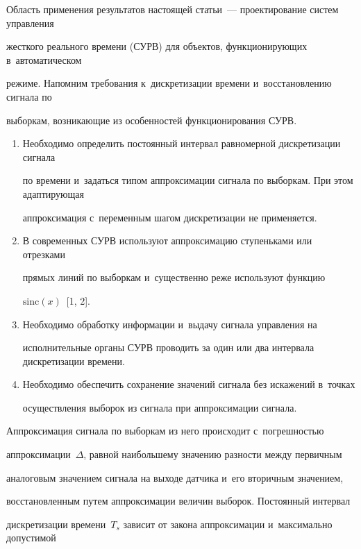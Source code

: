   Область применения результатов настоящей статьи~--- проектирование систем управления 


жесткого реального времени (СУРВ) для объектов, функ\-цио\-ни\-ру\-ющих в~автоматическом 


режиме. Напомним требования к~дискретизации времени и~восстановлению сигнала по 


выборкам, возникающие из особенностей функционирования СУРВ.


  \begin{enumerate}[1.]


  \item Необходимо определить постоянный интервал равномерной дискретизации сигнала 


по времени и~задаться типом аппроксимации сигнала по выборкам. При этом адаптирующая 


аппроксимация с~переменным шагом дискретизации не применяется.


  \item В современных СУРВ используют аппроксимацию ступеньками или отрезками 


прямых линий по выборкам и~существенно реже используют функцию 


$\mathrm{sinc}(x)$~[1, 2].


  \item Необходимо обработку информации и~выдачу сигнала управления на 


исполнительные органы СУРВ проводить за один или два интервала дискретизации времени.


  \item Необходимо обеспечить сохранение значений сигнала без искажений в~точках 


осуществления выборок из сигнала при аппроксимации сигнала. 


  \end{enumerate}


  


  Аппроксимация сигнала по выборкам из него происходит с~погрешностью 


аппроксимации~$\Delta$, равной наибольшему значению разности между первичным 


аналоговым значением сигнала на выходе датчика и~его вторичным значением, 


восстановленным путем аппроксимации величин выборок. Постоянный интервал 


дискретизации времени~$T_s$ зависит от закона аппроксимации и~максимально допустимой 


